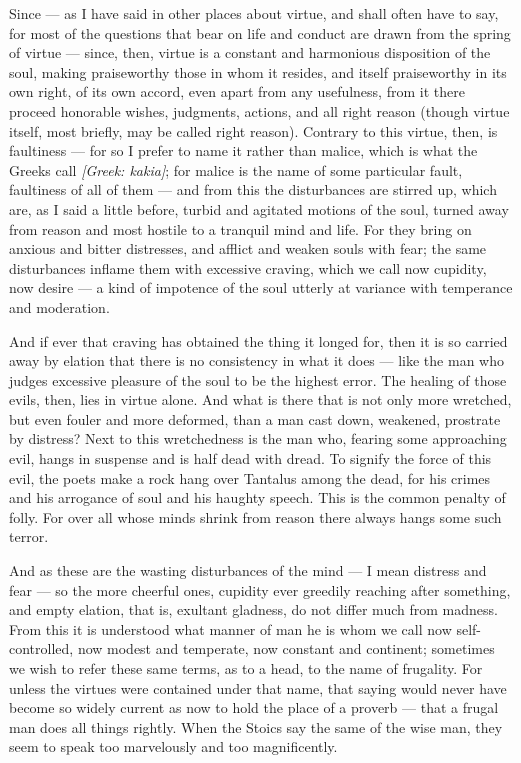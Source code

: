  Since — as I have said in other places about virtue, and shall often have to say, for most of the questions that bear on life and conduct are drawn from the spring of virtue — since, then, virtue is a constant and harmonious disposition of the soul, making praiseworthy those in whom it resides, and itself praiseworthy in its own right, of its own accord, even apart from any usefulness, from it there proceed honorable wishes, judgments, actions, and all right reason (though virtue itself, most briefly, may be called right reason). Contrary to this virtue, then, is faultiness — for so I prefer to name it rather than malice, which is what the Greeks call \textit{[Greek: kakia]}; for malice is the name of some particular fault, faultiness of all of them — and from this the disturbances are stirred up, which are, as I said a little before, turbid and agitated motions of the soul, turned away from reason and most hostile to a tranquil mind and life. For they bring on anxious and bitter distresses, and afflict and weaken souls with fear; the same disturbances inflame them with excessive craving, which we call now cupidity, now desire — a kind of impotence of the soul utterly at variance with temperance and moderation.

 And if ever that craving has obtained the thing it longed for, then it is so carried away by elation that there is no consistency in what it does — like the man who judges excessive pleasure of the soul to be the highest error. The healing of those evils, then, lies in virtue alone. And what is there that is not only more wretched, but even fouler and more deformed, than a man cast down, weakened, prostrate by distress? Next to this wretchedness is the man who, fearing some approaching evil, hangs in suspense and is half dead with dread. To signify the force of this evil, the poets make a rock hang over Tantalus among the dead, for his crimes and his arrogance of soul and his haughty speech. This is the common penalty of folly. For over all whose minds shrink from reason there always hangs some such terror.

 And as these are the wasting disturbances of the mind — I mean distress and fear — so the more cheerful ones, cupidity ever greedily reaching after something, and empty elation, that is, exultant gladness, do not differ much from madness. From this it is understood what manner of man he is whom we call now self-controlled, now modest and temperate, now constant and continent; sometimes we wish to refer these same terms, as to a head, to the name of frugality. For unless the virtues were contained under that name, that saying would never have become so widely current as now to hold the place of a proverb — that a frugal man does all things rightly. When the Stoics say the same of the wise man, they seem to speak too marvelously and too magnificently.

